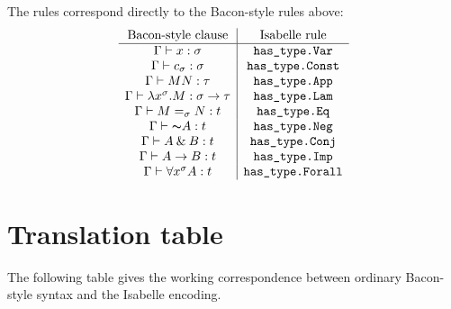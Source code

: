 \documentclass[12pt,leqno]{article}
\newcommand{\AND}{\ensuremath{\mathbin{\&}}}
\newcommand{\IC}{\ensuremath{\rightarrow}}
\newcommand{\NOT}{\ensuremath{\text{$\thicksim$}}}
\newcommand{\code}[1]{%
  \begingroup
  \def\_{\char`\_\allowbreak}%
  \texttt{#1}%
  \endgroup
}
\newcommand{\types}{\mathrel{\vdash}}
\begin{document}
The rules correspond directly to the Bacon-style rules above:
\[
\begin{array}{c|c}
\text{Bacon-style clause} & \text{Isabelle rule}\\
\hline
\Gamma\types x:\sigma & \code{has\_type.Var}\\
\Gamma\types c_\sigma:\sigma & \code{has\_type.Const}\\
\Gamma\types MN:\tau & \code{has\_type.App}\\
\Gamma\types \lambda x^\sigma.M:\sigma\to\tau & \code{has\_type.Lam}\\
\Gamma\types M=_\sigma N:t & \code{has\_type.Eq}\\
\Gamma\types\NOT A:t & \code{has\_type.Neg}\\
\Gamma\types A\AND B:t & \code{has\_type.Conj}\\
\Gamma\types A\IC B:t & \code{has\_type.Imp}\\
\Gamma\types \forall x^\sigma A:t & \code{has\_type.Forall}
\end{array}
\]

\section{Translation table}

The following table gives the working correspondence between ordinary
Bacon-style syntax and the Isabelle encoding.
\end{document}
